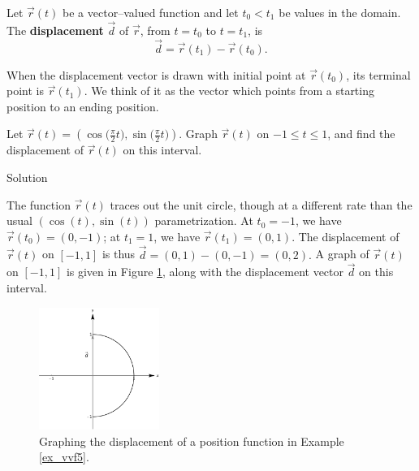 \begin{definition}[Displacement]\label{def:displacement}
Let $\vec r(t)$ be a vector--valued function and let $t_0<t_1$ be values in the domain. The \textbf{displacement} $\vec d$ of $\vec r$, from $t=t_0$ to $t=t_1$, is $$\vec d=\vec r(t_1)-\vec r(t_0).$$
\end{definition}

When the displacement vector is drawn with initial point at $\vec r(t_0)$, its terminal point is $\vec r(t_1)$. We think of it as the vector which points from a starting position to an ending position.

\begin{example}\label{ex_vvf5}
Let $\vec r(t) = \left( \cos \big(\frac{\pi}{2}t\big),\sin \big(\frac{\pi}2 t\big)\right)$. Graph $\vec r(t)$ on $-1\leq t\leq 1$, and find the displacement of $\vec r(t)$ on this interval.

Solution 

The function $\vec r(t)$ traces out the unit circle, though at a different rate than the usual $\left( \cos (t),\sin (t)\right)$ parametrization. At $t_0=-1$, we have $\vec r(t_0) = \left( 0,-1\right)$; at $t_1=1$, we have $\vec r(t_1) = \left( 0,1\right)$. The displacement of $\vec r(t)$ on $[-1,1]$ is thus $\vec d = \left( 0,1\right) - \left( 0,-1\right) = \left( 0,2\right).$ A graph of $\vec r(t)$ on $[-1,1]$ is given in Figure \ref{fig_vector_fun_4}, along with the displacement vector $\vec d$ on this interval.

\begin{figure}[H]
	\begin{center}
			\includegraphics[width=0.35\textwidth]{fig_vector_fun_4}
	\caption{Graphing the displacement of a position function in Example \ref{ex_vvf5}.}
	\label{fig_vector_fun_4}
	\end{center}
\end{figure}


\end{example}

